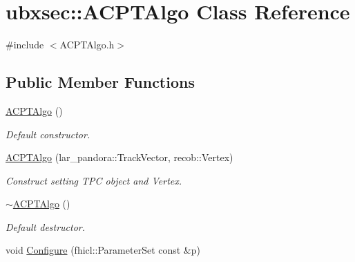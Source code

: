 \hypertarget{classubxsec_1_1ACPTAlgo}{\section{ubxsec\-:\-:\-A\-C\-P\-T\-Algo \-Class \-Reference}
\label{classubxsec_1_1ACPTAlgo}
}


{\ttfamily \#include $<$\-A\-C\-P\-T\-Algo.\-h$>$}

\subsection*{\-Public \-Member \-Functions}
\begin{DoxyCompactItemize}
\item 
\hypertarget{classubxsec_1_1ACPTAlgo_a68ed88283cbecf205983099237b770db}{\hyperlink{classubxsec_1_1ACPTAlgo_a68ed88283cbecf205983099237b770db}{\-A\-C\-P\-T\-Algo} ()}\label{classubxsec_1_1ACPTAlgo_a68ed88283cbecf205983099237b770db}

\begin{DoxyCompactList}\small\item\em \-Default constructor. \end{DoxyCompactList}\item 
\hypertarget{classubxsec_1_1ACPTAlgo_a561896f06ad50c98adc2db24bdb86b88}{\hyperlink{classubxsec_1_1ACPTAlgo_a561896f06ad50c98adc2db24bdb86b88}{\-A\-C\-P\-T\-Algo} (lar\-\_\-pandora\-::\-Track\-Vector, recob\-::\-Vertex)}\label{classubxsec_1_1ACPTAlgo_a561896f06ad50c98adc2db24bdb86b88}

\begin{DoxyCompactList}\small\item\em \-Construct setting \-T\-P\-C object and \-Vertex. \end{DoxyCompactList}\item 
\hypertarget{classubxsec_1_1ACPTAlgo_a5d275bcfb0b9d3935136d1387e548774}{\hyperlink{classubxsec_1_1ACPTAlgo_a5d275bcfb0b9d3935136d1387e548774}{$\sim$\-A\-C\-P\-T\-Algo} ()}\label{classubxsec_1_1ACPTAlgo_a5d275bcfb0b9d3935136d1387e548774}

\begin{DoxyCompactList}\small\item\em \-Default destructor. \end{DoxyCompactList}\item 
\hypertarget{classubxsec_1_1ACPTAlgo_a769831f453da3866e53fd99d7b092e7a}{void \hyperlink{classubxsec_1_1ACPTAlgo_a769831f453da3866e53fd99d7b092e7a}{\-Configure} (fhicl\-::\-Parameter\-Set const \&p)}\label{classubxsec_1_1ACPTAlgo_a769831f453da3866e53fd99d7b092e7a}


\end{DoxyCompactItemize}
